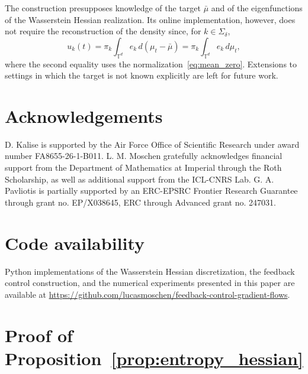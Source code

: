 \documentclass[11pt]{article}
\numberwithin{equation}{section}
\theoremstyle{definition}
\newcommand{\T}{\mathbb{T}}
\begin{document}
The construction presupposes knowledge of the target $\bar\mu$ and of the eigenfunctions of the Wasserstein Hessian realization.
Its online implementation, however, does not require the reconstruction of the density since, for $k \in \Sigma_\delta$,
\[
u_k(t) = \pi_k \int_{\T^d} e_k \, d(\mu_t - \bar\mu) = \pi_k \int_{\T^d} e_k \, d\mu_t,
\]
where the second equality uses the normalization~\eqref{eq:mean_zero}.
Extensions to settings in which the target is not known explicitly are left for future work.

\section*{Acknowledgements}

D. Kalise is supported by the Air Force Office of Scientific Research under award number FA8655-26-1-B011.
L. M. Moschen gratefully acknowledges financial support from the Department of Mathematics at Imperial through the Roth Scholarship, as well as additional support from the ICL-CNRS Lab.
G. A. Pavliotis is partially supported by an ERC-EPSRC Frontier Research Guarantee through grant no. EP/X038645, ERC through Advanced grant no. 247031.

\section*{Code availability}

Python implementations of the Wasserstein Hessian discretization, the feedback control construction, and the numerical experiments presented in this paper are available at \url{https://github.com/lucasmoschen/feedback-control-gradient-flows}.




\appendix

\section{Proof of Proposition~\ref{prop:entropy_hessian}}
\label{app:proof_prop_entropy}
\end{document}
